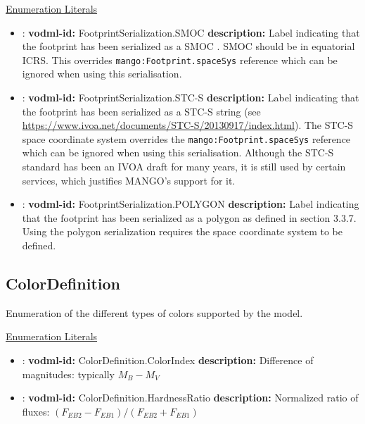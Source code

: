   \noindent \underline{Enumeration Literals}
  \vspace{-\parsep}
  \small
  \begin{itemize}
  
    \item[\textbf{SMOC}]: \textbf{vodml-id:} FootprintSerialization.SMOC \newline
          \textbf{description:} Label indicating that the footprint has been serialized as a SMOC \citep{2022ivoa.spec.0727F}. SMOC should be in equatorial ICRS. This overrides \texttt{mango:Footprint.spaceSys} reference which can be ignored when using this serialisation.
    \item[\textbf{STC-S}]: \textbf{vodml-id:} FootprintSerialization.STC-S \newline
          \textbf{description:} Label indicating that the footprint has been serialized as a STC-S string (see \url{https://www.ivoa.net/documents/STC-S/20130917/index.html}). The STC-S space coordinate system overrides the \texttt{mango:Footprint.spaceSys} reference which can be ignored when using this serialisation. Although the STC-S standard has been an IVOA draft for many years, it is still used by certain services, which justifies MANGO's support for it.
    \item[\textbf{POLYGON}]: \textbf{vodml-id:} FootprintSerialization.POLYGON \newline
          \textbf{description:} Label indicating that the footprint has been serialized as a polygon as defined in \cite{2017ivoa.spec.0517D} section 3.3.7. Using the polygon serialization requires the space coordinate system to be defined.
  \end{itemize}
  \normalsize


  \subsection{ColorDefinition}
  \label{sect:ColorDefinition}

  Enumeration of the different types of colors supported by the model.

  \noindent \underline{Enumeration Literals}
  \vspace{-\parsep}
  \small
  \begin{itemize}
  
    \item[\textbf{ColorIndex}]: \textbf{vodml-id:} ColorDefinition.ColorIndex \newline
          \textbf{description:} Difference of magnitudes: typically $M_B - M_V$
    \item[\textbf{HardnessRatio}]: \textbf{vodml-id:} ColorDefinition.HardnessRatio \newline
          \textbf{description:} Normalized ratio of fluxes: $(F_{EB2} - F_{EB1}) / (F_{EB2} + F_{EB1})$
  \end{itemize}
  \normalsize


